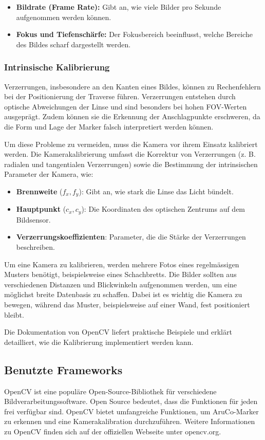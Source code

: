 \begin{itemize}
    \item \textbf{Bildrate (Frame Rate):} Gibt an, wie viele Bilder pro Sekunde aufgenommen werden können.
    \item \textbf{Fokus und Tiefenschärfe:} Der Fokusbereich beeinflusst, welche Bereiche des Bildes scharf dargestellt werden.
\end{itemize}


\subsubsection{Intrinsische Kalibrierung}
Verzerrungen, insbesondere an den Kanten eines Bildes, können zu Rechenfehlern 
bei der Positionierung der Traverse führen. Verzerrungen entstehen durch optische 
Abweichungen der Linse und sind besonders bei hohen FOV-Werten ausgeprägt. 
Zudem können sie die Erkennung der Anschlagpunkte erschweren, da die Form und 
Lage der Marker falsch interpretiert werden können.

Um diese Probleme zu vermeiden, muss die Kamera vor ihrem Einsatz kalibriert
werden. Die Kamerakalibrierung umfasst die Korrektur von Verzerrungen 
(z. B. radialen und tangentialen Verzerrungen) sowie die Bestimmung der 
intrinsischen Parameter der Kamera, wie:

\begin{itemize}
    \item \textbf{Brennweite} (\( f_x, f_y \)): Gibt an, wie stark die Linse das Licht bündelt.
    \item \textbf{Hauptpunkt} (\( c_x, c_y \)): Die Koordinaten des optischen Zentrums auf dem Bildsensor.
    \item \textbf{Verzerrungskoeffizienten}: Parameter, die die Stärke der Verzerrungen beschreiben.
\end{itemize}

Um eine Kamera zu kalibrieren, werden mehrere Fotos eines regelmässigen Musters 
benötigt, beispielsweise eines Schachbretts. Die Bilder sollten aus verschiedenen 
Distanzen und Blickwinkeln aufgenommen werden, um eine möglichst breite Datenbasis 
zu schaffen. Dabei ist es wichtig die Kamera zu bewegen, während das Muster, 
beispielsweise auf einer Wand, fest positioniert bleibt.

Die Dokumentation von OpenCV \cite{opencv_calibration_tutorial} liefert praktische 
Beispiele und erklärt detailliert, wie die Kalibrierung implementiert werden 
kann.


\subsection{Benutzte Frameworks}
OpenCV ist eine populäre Open-Source-Bibliothek für verschiedene Bildverarbeitungssoftware.
Open Source bedeutet, dass die Funktionen für jeden frei verfügbar sind. OpenCV bietet 
umfangreiche Funktionen, um AruCo-Marker zu erkennen und eine Kamerakalibration durchzuführen.
Weitere Informationen zu OpenCV finden sich auf der offiziellen Webseite unter opencv.org.

